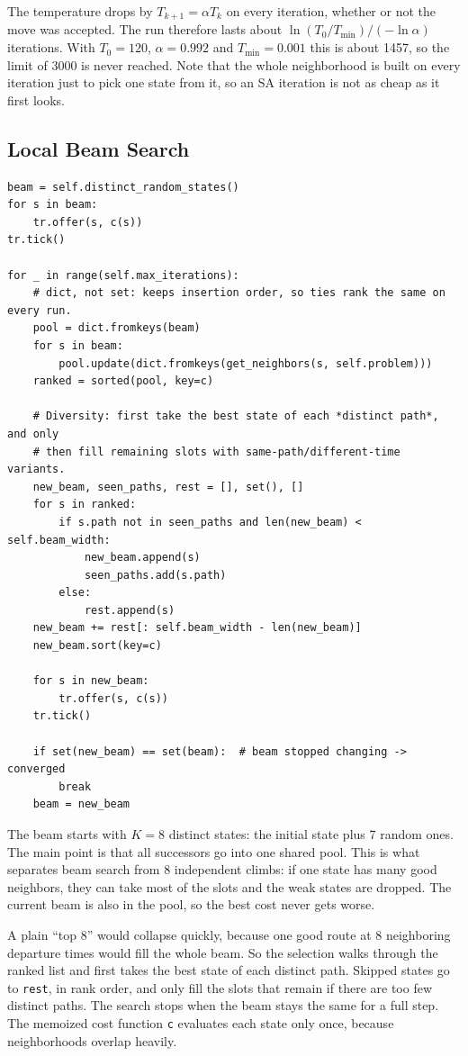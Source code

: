 \documentclass[11pt,a4paper]{article}
\newcommand{\col}[1]{\texttt{#1}}
\begin{document}
The temperature drops by $T_{k+1} = \alpha T_k$ on every iteration, whether or not the move was
accepted. The run therefore lasts about $\ln(T_0 / T_{\min}) / (-\ln \alpha)$ iterations. With
$T_0 = 120$, $\alpha = 0.992$ and $T_{\min} = 0.001$ this is about 1457, so the limit of 3000 is never
reached. Note that the whole neighborhood is built on every iteration just to pick one state from it,
so an SA iteration is not as cheap as it first looks.

\subsection{Local Beam Search}

\begin{lstlisting}
beam = self.distinct_random_states()
for s in beam:
    tr.offer(s, c(s))
tr.tick()

for _ in range(self.max_iterations):
    # dict, not set: keeps insertion order, so ties rank the same on every run.
    pool = dict.fromkeys(beam)
    for s in beam:
        pool.update(dict.fromkeys(get_neighbors(s, self.problem)))
    ranked = sorted(pool, key=c)

    # Diversity: first take the best state of each *distinct path*, and only
    # then fill remaining slots with same-path/different-time variants.
    new_beam, seen_paths, rest = [], set(), []
    for s in ranked:
        if s.path not in seen_paths and len(new_beam) < self.beam_width:
            new_beam.append(s)
            seen_paths.add(s.path)
        else:
            rest.append(s)
    new_beam += rest[: self.beam_width - len(new_beam)]
    new_beam.sort(key=c)

    for s in new_beam:
        tr.offer(s, c(s))
    tr.tick()

    if set(new_beam) == set(beam):  # beam stopped changing -> converged
        break
    beam = new_beam
\end{lstlisting}

\noindent The beam starts with $K = 8$ distinct states: the initial state plus 7 random ones. The main
point is that all successors go into one shared pool. This is what separates beam search from 8
independent climbs: if one state has many good neighbors, they can take most of the slots and the weak
states are dropped. The current beam is also in the pool, so the best cost never gets worse.

A plain ``top 8'' would collapse quickly, because one good route at 8 neighboring departure times
would fill the whole beam. So the selection walks through the ranked list and first takes the best state of each
distinct path. Skipped states go to \col{rest}, in rank order, and only fill the slots that remain if
there are too few distinct paths. The search stops when the beam stays the same for a full step. The
memoized cost function \col{c} evaluates each state only once, because neighborhoods overlap heavily.
\end{document}
